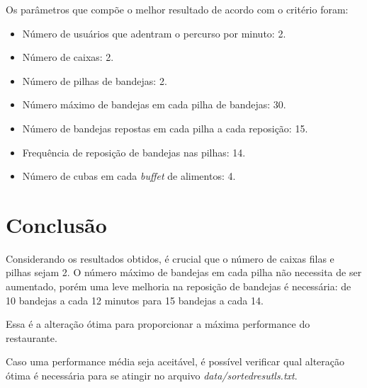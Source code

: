 \documentclass{article}
\begin{document}
Os parâmetros que compõe o melhor resultado de acordo com o critério foram:
\begin{itemize}
  \setlength\itemsep{0px}
  \item Número de usuários que adentram o percurso por minuto: 2.
  \item Número de caixas: 2.
  \item Número de pilhas de bandejas: 2.
  \item Número máximo de bandejas em cada pilha de bandejas: 30.
  \item Número de bandejas repostas em cada pilha a cada reposição: 15.
  \item Frequência de reposição de bandejas nas pilhas: 14.
  \item Número de cubas em cada \textit{buffet} de alimentos: 4.
\end{itemize}

\section{Conclusão}
Considerando os resultados obtidos, é crucial que o número de caixas filas e pilhas sejam 2. O número máximo de bandejas em cada pilha não necessita de ser aumentado, porém uma leve melhoria na reposição de bandejas é necessária: de 10 bandejas a cada 12 minutos para 15 bandejas a cada 14.

Essa é a alteração ótima para proporcionar a máxima performance do restaurante.

Caso uma performance média seja aceitável, é possível verificar qual alteração ótima é necessária para se atingir no arquivo \textit{data/sorted\textunderscore resutls.txt}.
\end{document}
